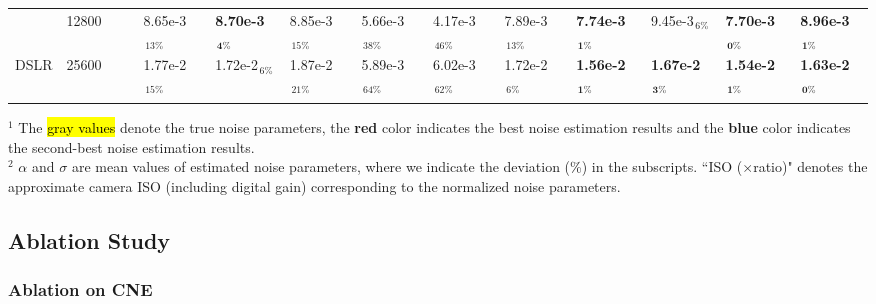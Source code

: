 \documentclass[lettersize,journal]{IEEEtran}
\begin{document}
\begin{table}[t]
\begin{tabular}{c|c|cc|ll|ll|ll|ll|ll}
			& 12800 & \cellcolor{lightgray}{7.70e-3} & \cellcolor{lightgray}{9.00e-3} & 8.65e-3$_{\,13\%}$ & \textbf{\color{blue}8.70e-3$_\mathbf{\,4\%}$} & 8.85e-3$_{\,15\%}$ & 5.66e-3$_{\,38\%}$ & 4.17e-3$_{\,46\%}$ & 7.89e-3$_{\,13\%}$ & \textbf{\color{blue}7.74e-3$_\mathbf{\,1\%}$} & 9.45e-3$_{\,6\%}$ & \textbf{\color{red}7.70e-3$_\mathbf{\,0\%}$} & \textbf{\color{red}8.96e-3$_\mathbf{\,1\%}$}\\
			\multirow{-4}{*}{DSLR} & 25600 & \cellcolor{lightgray}{1.55e-2} & \cellcolor{lightgray}{1.63e-2} & 1.77e-2$_{\,15\%}$ & 1.72e-2$_{\,6\%}$ & 1.87e-2$_{\,21\%}$ & 5.89e-3$_{\,64\%}$ & 6.02e-3$_{\,62\%}$ & 1.72e-2$_{\,6\%}$ & \textbf{\color{blue}1.56e-2$_\mathbf{\,1\%}$} & \textbf{\color{blue}1.67e-2$_\mathbf{\,3\%}$} & \textbf{\color{red}1.54e-2$_\mathbf{\,1\%}$} & \textbf{\color{red}1.63e-2$_\mathbf{\,0\%}$}\\
			\Xhline{0.8pt}
		\end{tabular}
		
	\footnotesize
	\begin{flushleft}
		$^1$ The \hl{gray values} denote the true noise parameters, the \textbf{\color{red}red} color indicates the best noise estimation results and the \textbf{\color{blue}blue} color indicates the second-best noise estimation results.\\
		$^2$ $\alpha$ and $\sigma$ are mean values of estimated noise parameters, where we indicate the deviation (\%) in the subscripts. ``ISO ($\times$ratio)" denotes the approximate camera ISO (including digital gain) corresponding to the normalized noise parameters.
	\end{flushleft}
	\vspace{-6pt}
\end{table}

\subsection{Ablation Study}
\subsubsection{\textbf{Ablation on CNE}}
\end{document}
